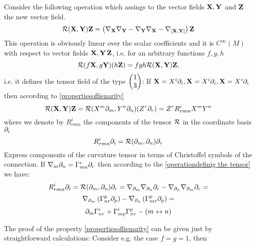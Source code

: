\documentclass[12pt]{article}
\theoremstyle{theorem}
\numberwithin{equation}{section}
\begin{document}
Consider the following operation which assings to the vector fields ${\bf X},{\bf Y}$ and ${\bf Z}$ the new vector field.
\begin{equation}\label{operationdefinig the tensor}
   {\cal R}({\bf X},{\bf Y}){\bf Z}=
    \left(
    \nabla_{\bf X}\nabla_{\bf Y}-\nabla_{\bf Y}\nabla_{\bf X}-
   \nabla_{[{\bf X},{\bf Y}]}
    \right){\bf Z}
\end{equation}
This operation is obviously linear over the scalar coefficients and it is $C^{\infty}(M)$
with respect to vector fields ${\bf X},{\bf Y}\,{\bf Z}$, i.e. for an arbitrary functions
$f,g,h$
        \begin{equation}\label{propertiesoflienarity}
            {\cal R}(f{\bf X},g{\bf Y})(h{\bf Z})=fgh{\cal R}({\bf X},{\bf Y}){\bf Z},
        \end{equation}
        i.e. it defines
the tensor field of the type $\begin{pmatrix}1\cr 3\end{pmatrix}$: If ${\bf X}=X^i\partial_i, {\bf X}=X^i\partial_i,{\bf X}=X^i\partial_i$
then according to \eqref{propertiesoflienarity}
           $$
        {\cal R}({\bf X},{\bf Y}){\bf Z}={\cal R}(X^m\partial_m,Y^n\partial_n)(Z^r\partial_r)=Z^rR^i_{rmn}X^mY^n
           $$
where we denote by $R^i_{rmn}$ the components of the tensor $\cal R$ in the coordinate basis ${\partial_i}$
\begin{equation}\label{componentsofcurvaturetensor}
    R^i_{rmn}\partial_i={\cal R}(\partial_m,\partial_n)\partial_r
\end{equation}
Express components of the curvature tensor in terms of Christoffel symbols of the connection.
If $\nabla_m\partial_n=\Gamma_{mn}^r\partial_r$ then according to the \eqref{operationdefinig the tensor} we have:
                $$
        R^i_{rmn}\partial_i={\cal R}(\partial_m,\partial_n)\partial_r=\nabla_{\partial_m}\nabla_{\partial_n}\partial_r-\nabla_{\partial_n}\nabla_{\partial_m}\partial_r=
                    $$
                    $$
              \nabla_{\partial_m}\left(\Gamma_{nr}^p\partial_p\right)-\nabla_{\partial_n}\left(\Gamma_{mr}^p\partial_p\right)=
                $$
                \begin{equation}\label{curvatureincomponents}
                \partial_m\Gamma_{nr}^i+\Gamma_{mp}^i\Gamma_{nr}^p-\left(m\leftrightarrow n\right)
                \end{equation}

 The proof of the property \eqref{propertiesoflienarity} can be given just  by straightforward calculations:
     Consider e.g. the case $f=g=1$, then
\end{document}
